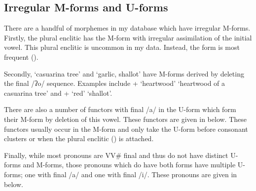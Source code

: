 \subsection{Irregular M-forms and U-forms}\label{sec:IrrMfor}
There are a handful of morphemes in my database which have irregular M-forms.
Firstly, the plural enclitic 
has the M-form  with irregular assimilation of the initial vowel.
This plural enclitic is uncommon in my data.
Instead, the form  is most frequent ().

Secondly,  `casuarina tree'
and  `garlic, shallot' have M-forms
derived by deleting the final /ʔo/ sequence.
Examples include  +  `heartwood'
{\ra}  `heartwood of a casuarina tree'
and  +  `red' {\ra}  `shallot'.

There are also a number of functors with final
/a/ in the U-form which form their M-form by deletion of this vowel.
These functors are given in  below.
These functors usually occur in the M-form
and only take the U-form before consonant clusters
or when the plural enclitic  () is attached.

\newpage
\begin{exe}
	\label{ex:CvaCC}
	\gw{}
\end{exe}

Finally, while most pronouns are VV{\#} final and thus
do not have distinct U-forms and M-forms,
those pronouns which do have both forms have multiple U-forms;
one with final /a/ and one with final /i/.
These pronouns are given in  below.


